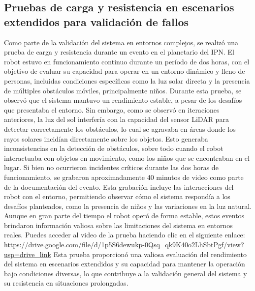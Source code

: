 \subsection{Pruebas de carga y resistencia en escenarios extendidos para validaci\'on de fallos}

    Como parte de la validaci\'on del sistema en entornos complejos, se realiz\'o una prueba de carga  
        y resistencia durante un evento en el planetario del IPN. El robot estuvo en funcionamiento 
        continuo durante un per\'iodo de dos horas, con el objetivo de evaluar su capacidad para operar 
        en un entorno din\'amico y lleno de personas, incluidas condiciones espec\'ificas como la luz solar 
        directa y la presencia de m\'ultiples obst\'aculos m\'oviles, principalmente ni\~nos.
    \vskip 0.5cm
    Durante esta prueba, se observ\'o que el sistema mantuvo un rendimiento estable, a pesar de los desaf\'ios 
        que presentaba el entorno. Sin embargo, como se observ\'o en iteraciones anteriores, la luz del 
        sol interfer\'ia con la capacidad del sensor LiDAR para detectar correctamente los obst\'aculos, 
        lo cual se agravaba en \'areas donde los rayos solares incid\'ian directamente sobre los objetos. 
        Esto generaba inconsistencias en la detecci\'on de obst\'aculos, sobre todo cuando el robot interactuaba 
        con objetos en movimiento, como los ni\~nos que se encontraban en el lugar.
    \vskip 0.5cm
    Si bien no ocurrieron incidentes cr\'iticos durante las dos horas de funcionamiento, se grabaron aproximadamente 
        40 minutos de video como parte de la documentaci\'on del evento. Esta grabaci\'on incluye las interacciones 
        del robot con el entorno, permitiendo observar c\'omo el sistema respond\'ia a los desaf\'ios planteados, como 
        la presencia de ni\~nos y las variaciones en la luz natural. Aunque en gran parte del tiempo el robot oper\'o 
        de forma estable, estos eventos brindaron informaci\'on valiosa sobre las limitaciones del sistema en entornos reales.
    \vskip 0.5cm
    Puedes acceder al video de la prueba haciendo clic en el siguiente enlace: \url{https://drive.google.com/file/d/1p5S6dewukp-0Qsq_qk9K40o2LhSbtPgf/view?usp=drive_link}
    \vskip 0.5cm
    Esta prueba proporcion\'o una valiosa evaluaci\'on del rendimiento del sistema en escenarios extendidos y su 
        capacidad para mantener la operaci\'on bajo condiciones diversas, lo que contribuye a la validaci\'on general 
        del sistema y su resistencia en situaciones prolongadas.
